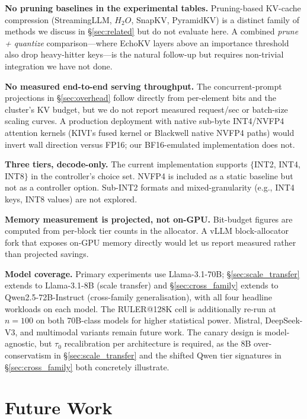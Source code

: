 \documentclass{article}
\begin{document}
\textbf{No pruning baselines in the experimental tables.} Pruning-based
KV-cache compression (StreamingLLM, $H_2O$, SnapKV, PyramidKV) is a
distinct family of methods we discuss in \S\ref{sec:related} but do not
evaluate here. A combined \emph{prune + quantize} comparison---where
EchoKV layers above an importance threshold also drop heavy-hitter
keys---is the natural follow-up but requires non-trivial integration we
have not done.

\textbf{No measured end-to-end serving throughput.} The
concurrent-prompt projections in \S\ref{sec:overhead} follow directly
from per-element bits and the cluster's KV budget, but we do not report
measured request/sec or batch-size scaling curves. A production
deployment with native sub-byte INT4/NVFP4 attention kernels (KIVI's
fused kernel or Blackwell native NVFP4 paths) would invert wall direction
versus FP16; our BF16-emulated implementation does not.

\textbf{Three tiers, decode-only.} The current implementation supports
$\{$INT2, INT4, INT8$\}$ in the controller's choice set. NVFP4 is included
as a static baseline but not as a controller option. Sub-INT2 formats and
mixed-granularity (e.g., INT4 keys, INT8 values) are not explored.

\textbf{Memory measurement is projected, not on-GPU.} Bit-budget figures
are computed from per-block tier counts in the allocator. A vLLM
block-allocator fork that exposes on-GPU memory directly would let us
report measured rather than projected savings.

\textbf{Model coverage.} Primary experiments use Llama-3.1-70B;
\S\ref{sec:scale_transfer} extends to Llama-3.1-8B (scale transfer)
and \S\ref{sec:cross_family} extends to Qwen2.5-72B-Instruct (cross-family
generalisation), with all four headline workloads on each model. The
RULER@128K cell is additionally re-run at $n{=}100$ on both 70B-class
models for higher statistical power. Mistral, DeepSeek-V3, and
multimodal variants remain future work. The canary design is
model-agnostic, but $\tau_0$ recalibration per architecture is required,
as the 8B over-conservatism in \S\ref{sec:scale_transfer} and the
shifted Qwen tier signatures in \S\ref{sec:cross_family} both
concretely illustrate.

\section{Future Work}
\label{sec:future}
\end{document}
